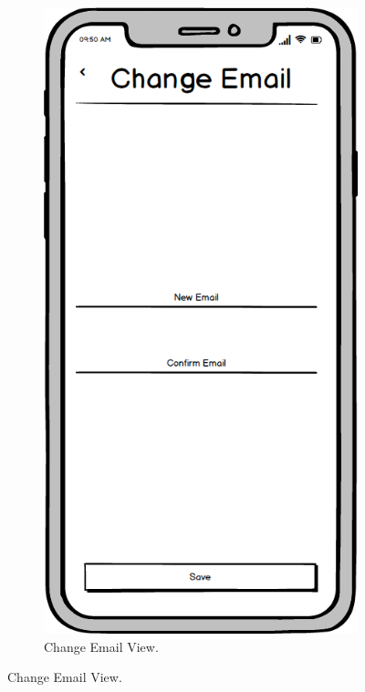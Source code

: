 \begin{figure}
    \centering
    \begin{subfigure}[b]{0.3\textwidth}
        \centering
        \includegraphics[width=\textwidth]{./graphics/design/Change Email.png}
        \caption{Change Email View.}

\end{subfigure}
\end{figure}

